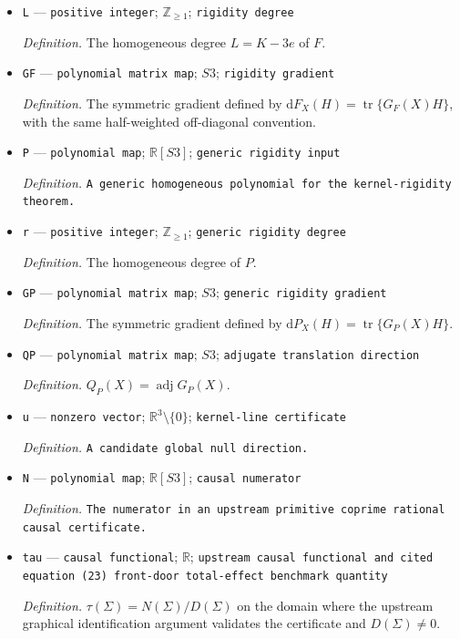 \documentclass{article}
\begin{document}
\begin{itemize}
  \item \texttt{L} --- \texttt{positive integer}; \(\mathbb Z_{\geq1}\); \texttt{rigidity degree}
  \par\smallskip\noindent\emph{Definition.} The homogeneous degree \(L=K-3e\) of \(F\).
  \item \texttt{GF} --- \texttt{polynomial matrix map}; \(S3\); \texttt{rigidity gradient}
  \par\smallskip\noindent\emph{Definition.} The symmetric gradient defined by \(\mathrm dF_X(H)=\operatorname{tr}\{G_F(X)H\}\), with the same half-weighted off-diagonal convention.
  \item \texttt{P} --- \texttt{polynomial map}; \(\mathbb R[S3]\); \texttt{generic rigidity input}
  \par\smallskip\noindent\emph{Definition.} \texttt{A generic homogeneous polynomial for the kernel-\allowbreak{}rigidity theorem.}
  \item \texttt{r} --- \texttt{positive integer}; \(\mathbb Z_{\geq1}\); \texttt{generic rigidity degree}
  \par\smallskip\noindent\emph{Definition.} The homogeneous degree of \(P\).
  \item \texttt{GP} --- \texttt{polynomial matrix map}; \(S3\); \texttt{generic rigidity gradient}
  \par\smallskip\noindent\emph{Definition.} The symmetric gradient defined by \(\mathrm dP_X(H)=\operatorname{tr}\{G_P(X)H\}\).
  \item \texttt{QP} --- \texttt{polynomial matrix map}; \(S3\); \texttt{adjugate translation direction}
  \par\smallskip\noindent\emph{Definition.} \(Q_P(X)=\operatorname{adj}G_P(X)\).
  \item \texttt{u} --- \texttt{nonzero vector}; \(\mathbb R^3\setminus\{0\}\); \texttt{kernel-\allowbreak{}line certificate}
  \par\smallskip\noindent\emph{Definition.} \texttt{A candidate global null direction.}
  \item \texttt{N} --- \texttt{polynomial map}; \(\mathbb R[S3]\); \texttt{causal numerator}
  \par\smallskip\noindent\emph{Definition.} \texttt{The numerator in an upstream primitive coprime rational causal certificate.}
  \item \texttt{tau} --- \texttt{causal functional}; \(\mathbb R\); \texttt{upstream causal functional and cited equation (23) front-\allowbreak{}door total-\allowbreak{}effect benchmark quantity}
  \par\smallskip\noindent\emph{Definition.} \(\tau(\Sigma)=N(\Sigma)/D(\Sigma)\) on the domain where the upstream graphical identification argument validates the certificate and \(D(\Sigma)\neq0\).

\end{itemize}
\end{document}
